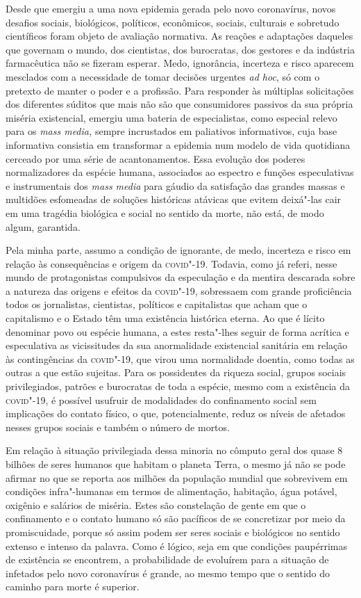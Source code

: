 Desde que emergiu a uma nova epidemia gerada pelo novo coronavírus,
novos desafios sociais, biológicos, políticos, econômicos, sociais,
culturais e sobretudo científicos foram objeto de avaliação normativa.
As reações e adaptações daqueles que governam o mundo, dos cientistas,
dos burocratas, dos gestores e da indústria farmacêutica não se fizeram
esperar. Medo, ignorância, incerteza e risco aparecem mesclados com a
necessidade de tomar decisões urgentes \emph{ad hoc}, só com o pretexto
de manter o poder e a profissão. Para responder às múltiplas
solicitações dos diferentes súditos que mais não são que consumidores
passivos da sua própria miséria existencial, emergiu uma bateria de
especialistas, como especial relevo para os \emph{mass media,} sempre
incrustados em paliativos informativos, cuja base informativa consistia
em transformar a epidemia num modelo de vida quotidiana cerceado por uma
série de acantonamentos. Essa evolução dos poderes normalizadores da
espécie humana, associados ao espectro e funções especulativas e
instrumentais dos \emph{mass media} para gáudio da satisfação das
grandes massas e multidões esfomeadas de soluções históricas atávicas
que evitem deixá"-las cair em uma tragédia biológica e social no sentido
da morte, não está, de modo algum, garantida.

Pela minha parte, assumo a condição de ignorante, de medo, incerteza e
risco em relação às consequências e origem da \textsc{covid}"-19. Todavia, como já
referi, nesse mundo de protagonistas compulsivos da especulação e da
mentira descarada sobre a natureza das origens e efeitos da \textsc{covid}"-19,
sobressaem com grande proficiência todos os jornalistas, cientistas,
políticos e capitalistas que acham que o capitalismo e o Estado têm uma
existência histórica eterna. Ao que é lícito denominar povo ou espécie
humana, a estes resta"-lhes seguir de forma acrítica e especulativa as
vicissitudes da sua anormalidade existencial sanitária em relação às
contingências da \textsc{covid}"-19, que virou uma normalidade doentia, como todas
as outras a que estão sujeitas. Para os possidentes da riqueza social,
grupos sociais privilegiados, patrões e burocratas de toda a espécie,
mesmo com a existência da \textsc{covid}"-19, é possível usufruir de modalidades
do confinamento social sem implicações do contato físico, o que,
potencialmente, reduz os níveis de afetados nesses grupos sociais e
também o número de mortos.

Em relação à situação privilegiada dessa minoria no cômputo geral dos
quase 8 bilhões de seres humanos que habitam o planeta Terra, o mesmo já
não se pode afirmar no que se reporta aos milhões da população mundial
que sobrevivem em condições infra"-humanas em termos de alimentação,
habitação, água potável, oxigênio e salários de miséria. Estes são
constelação de gente em que o confinamento e o contato humano só são
pacíficos de se concretizar por meio da promiscuidade, porque só assim
podem ser seres sociais e biológicos no sentido extenso e intenso da
palavra. Como é lógico, seja em que condições paupérrimas de existência
se encontrem, a probabilidade de evoluírem para a situação de infetados
pelo novo coronavírus é grande, ao mesmo tempo que o sentido do caminho
para morte é superior.

